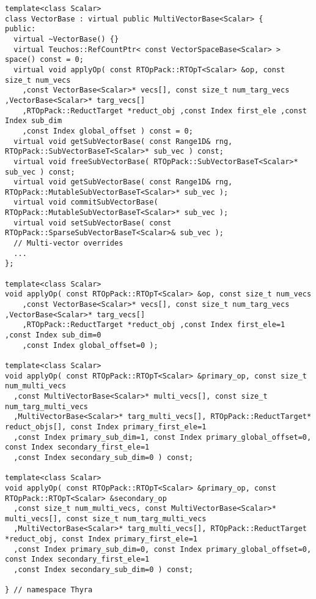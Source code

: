 {\begin{verbatim}
template<class Scalar>
class VectorBase : virtual public MultiVectorBase<Scalar> {
public:
  virtual ~VectorBase() {}
  virtual Teuchos::RefCountPtr< const VectorSpaceBase<Scalar> > space() const = 0;
  virtual void applyOp( const RTOpPack::RTOpT<Scalar> &op, const size_t num_vecs
    ,const VectorBase<Scalar>* vecs[], const size_t num_targ_vecs ,VectorBase<Scalar>* targ_vecs[]
    ,RTOpPack::ReductTarget *reduct_obj ,const Index first_ele ,const Index sub_dim
    ,const Index global_offset ) const = 0;
  virtual void getSubVectorBase( const Range1D& rng, RTOpPack::SubVectorBaseT<Scalar>* sub_vec ) const;
  virtual void freeSubVectorBase( RTOpPack::SubVectorBaseT<Scalar>* sub_vec ) const;
  virtual void getSubVectorBase( const Range1D& rng, RTOpPack::MutableSubVectorBaseT<Scalar>* sub_vec );
  virtual void commitSubVectorBase( RTOpPack::MutableSubVectorBaseT<Scalar>* sub_vec );
  virtual void setSubVectorBase( const RTOpPack::SparseSubVectorBaseT<Scalar>& sub_vec );
  // Multi-vector overrides
  ...
};

template<class Scalar>
void applyOp( const RTOpPack::RTOpT<Scalar> &op, const size_t num_vecs
    ,const VectorBase<Scalar>* vecs[], const size_t num_targ_vecs ,VectorBase<Scalar>* targ_vecs[]
    ,RTOpPack::ReductTarget *reduct_obj ,const Index first_ele=1 ,const Index sub_dim=0
    ,const Index global_offset=0 );

template<class Scalar>
void applyOp( const RTOpPack::RTOpT<Scalar> &primary_op, const size_t num_multi_vecs
  ,const MultiVectorBase<Scalar>* multi_vecs[], const size_t num_targ_multi_vecs
  ,MultiVectorBase<Scalar>* targ_multi_vecs[], RTOpPack::ReductTarget* reduct_objs[], const Index primary_first_ele=1
  ,const Index primary_sub_dim=1, const Index primary_global_offset=0, const Index secondary_first_ele=1
  ,const Index secondary_sub_dim=0 ) const;

template<class Scalar>
void applyOp( const RTOpPack::RTOpT<Scalar> &primary_op, const RTOpPack::RTOpT<Scalar> &secondary_op
  ,const size_t num_multi_vecs, const MultiVectorBase<Scalar>* multi_vecs[], const size_t num_targ_multi_vecs
  ,MultiVectorBase<Scalar>* targ_multi_vecs[], RTOpPack::ReductTarget *reduct_obj, const Index primary_first_ele=1
  ,const Index primary_sub_dim=0, const Index primary_global_offset=0, const Index secondary_first_ele=1
  ,const Index secondary_sub_dim=0 ) const;

} // namespace Thyra
\end{verbatim}}

